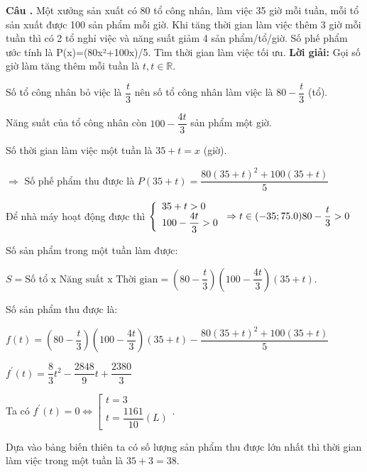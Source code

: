 \documentclass[12pt]{article}
\newcounter{ex}
\newenvironment{ex}{\refstepcounter{ex}\textbf{Câu \theex.} }{\vspace{0.5cm}}
\newcommand{\loigiai}[1]{\textbf{Lời giải:} #1}
\begin{document}
\begin{ex} Một xưởng sản xuất có 80 tổ công nhân, làm việc 35 giờ mỗi tuần, mỗi tổ sản xuất được 100 sản phẩm mỗi giờ. Khi tăng thời gian làm việc thêm 3 giờ mỗi tuần thì có 2 tổ nghỉ việc và năng suất giảm 4 sản phẩm/tổ/giờ. Số phế phẩm ước tính là P(x)=(80x²+100x)/5. Tìm thời gian làm việc tối ưu.
\loigiai{
	Gọi số giờ làm tăng thêm mỗi tuần là \(t, t \in \mathbb{R}\). 
	
	Số tổ công nhân bỏ việc là \(\dfrac{t}{3}\) nên số tổ công nhân làm việc là \(80-\dfrac{t}{3}\) (tổ). 
	
	Năng suất của tổ công nhân còn \(100-\dfrac{4 t}{3}\) sản phẩm một giờ. 
	
	Số thời gian làm việc một tuần là \(35+t=x\) (giờ).
	
	\(\Rightarrow\) Số phế phẩm thu được là \(P(35+t)=\dfrac{80(35+t)^2+100(35+t)}{5}\)
	
	Để nhà máy hoạt động được thì \(\left\{\begin{array}{l}35+t>0 \\ 100-\dfrac{4 t}{3}>0\end{array}\right. \Rightarrow t \in(-35 ; 75.0) \\
	80-\dfrac{t}{3}>0\)
	
	Số sản phẩm trong một tuần làm được: 
	
	\(S=\text{Số tổ x Năng suất x Thời gian}= \left(80-\dfrac{t}{3}\right)\left(100-\dfrac{4 t}{3}\right)(35+t)\). 
	
	Số sản phẩm thu được là:
	
	\(
	f(t)  =\left(80-\dfrac{t}{3}\right)\left(100-\dfrac{4 t}{3}\right)(35+t)-\dfrac{80(35+t)^2+100(35+t)}{5} \)
	
	\(f^{\prime}(t) = \dfrac{8}{3} t^2-\dfrac{2848}{9} t+\dfrac{2380}{3}\)
	
	Ta có \(f^{\prime}(t)=0 \Leftrightarrow\left[\begin{array}{l}t=3 \\ t=\dfrac{1161}{10}(L)\end{array}\right.\). 
	
	Dựa vào bảng biến thiên ta có số lượng sản phẩm thu được lớn nhất thì thời gian làm việc trong một tuần là \(35+3=38\).
	
}
\end{ex}
\end{document}
